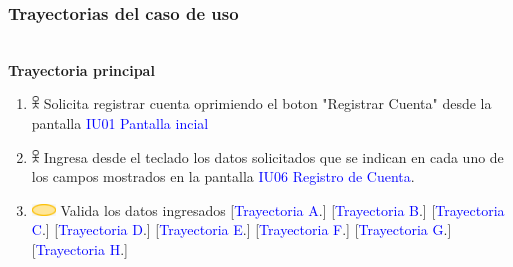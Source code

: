     \subsubsection{Trayectorias del caso de uso}
     \\
     \textbf{Trayectoria principal}\\
                \begin{enumerate}
                        \item \includegraphics[width=0.0150\textwidth]{Figuras/persona.png} Solicita registrar cuenta oprimiendo el boton "Registrar Cuenta" desde la pantalla \textcolor{blue}{IU01 Pantalla incial}

                        \item \includegraphics[width=0.0150\textwidth]{Figuras/persona.png} Ingresa desde el teclado los datos solicitados que se indican en cada uno de los campos mostrados en la pantalla \textcolor{blue}{IU06 Registro de Cuenta}.
                        
                        
                        \item \includegraphics[width=0.0500\textwidth]{Figuras/sistema.png} Valida los datos ingresados 
                        [\textcolor{blue}{Trayectoria A}.]
                        [\textcolor{blue}{Trayectoria B}.]
                        [\textcolor{blue}{Trayectoria C}.]
[\textcolor{blue}{Trayectoria D}.]
[\textcolor{blue}{Trayectoria E}.]
[\textcolor{blue}{Trayectoria F}.]
[\textcolor{blue}{Trayectoria G}.]
[\textcolor{blue}{Trayectoria H}.]
                        
                        

\end{enumerate}

